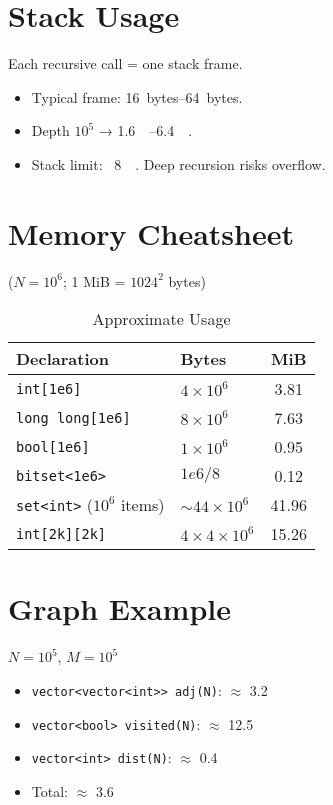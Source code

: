 \documentclass[12pt,a4paper]{article}
\begin{document}
\section{Stack Usage}
Each recursive call = one stack frame.
\begin{itemize}
    \item Typical frame: \SIrange{16}{64}{bytes}.
    \item Depth $10^5$ → \SIrange{1.6}{6.4}{\mega\byte}.
    \item Stack limit: ~\SI{8}{\mega\byte}. Deep recursion risks overflow.
\end{itemize}

\section{Memory Cheatsheet}
($N = 10^6$; 1 MiB = $1024^2$ bytes)
\begin{table}[htbp]
    \centering
    \caption{Approximate Usage}
    \begin{tabular}{llS[table-format=4.2]}
        \toprule
        \textbf{Declaration} & \textbf{Bytes} & \textbf{MiB} \\
        \midrule
        \texttt{int[1e6]} & $4 \times 10^6$ & 3.81 \\
        \texttt{long long[1e6]} & $8 \times 10^6$ & 7.63 \\
        \texttt{bool[1e6]} & $1 \times 10^6$ & 0.95 \\
        \texttt{bitset<1e6>} & $1e6/8$ & 0.12 \\
        \texttt{set<int>} ($10^6$ items) & $\sim 44 \times 10^6$ & 41.96 \\
        \texttt{int[2k][2k]} & $4 \times 4 \times 10^6$ & 15.26 \\
        \bottomrule
    \end{tabular}
\end{table}

\section{Graph Example}
$N = 10^5$, $M = 10^5$
\begin{itemize}
    \item \texttt{vector<vector<int>> adj(N)}: $\approx$ \SI{3.2}{\mega\byte}
    \item \texttt{vector<bool> visited(N)}: $\approx$ \SI{12.5}{\kilo\byte}
    \item \texttt{vector<int> dist(N)}: $\approx$ \SI{0.4}{\mega\byte}
    \item Total: $\approx$ \SI{3.6}{\mega\byte}
\end{itemize}
\end{document}
